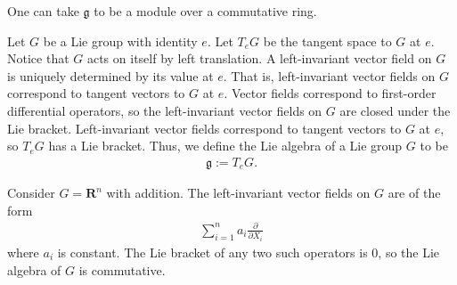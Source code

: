 \documentclass [11 pt, twoside] {article}
\begin{document}
\begin{remark}
	One can take $\mathfrak{g}$ to be a module over a commutative ring.
\end{remark}

Let $G$ be a Lie group with identity $e$. Let $T_{e}G$ be the tangent space to $G$ at $e$.
Notice that $G$ acts on itself by left translation. A left-invariant vector field on $G$ is uniquely determined by its value at $e$. That is, left-invariant vector fields on $G$correspond to tangent vectors to $G$ at $e$.
Vector fields correspond to first-order differential operators, so the left-invariant vector fields on $G$ are closed under the Lie bracket. Left-invariant vector fields correspond to tangent vectors to $G$ at $e$, so $T_{e}G$ has a Lie bracket. Thus, we define the Lie algebra of a Lie group $G$ to be 
\begin{align*}
	\mathfrak{g} := T_{e}G.
\end{align*}

\begin{example}[ ]\label{}\text{}
Consider $G =\mathbf{R}^{n}$ with addition.
The left-invariant vector fields on $G$ are of the form
\begin{align*}
	\sum_{i=1}^{n} a_{i} \frac{\partial}{\partial X_{i}}
\end{align*}
where $a_{i}$ is constant.
The Lie bracket of any two such operators is $0$, so the Lie algebra of $G$ is commutative. 
\end{example}
\end{document}
